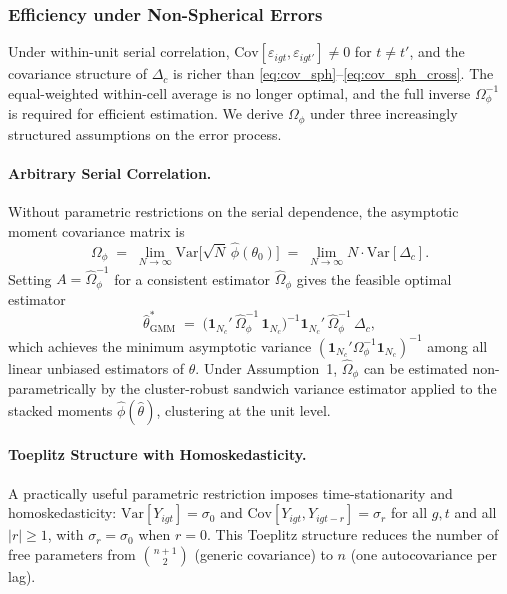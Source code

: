 \documentclass[12pt,letterpaper]{article}
\theoremstyle{remark}
\theoremstyle{definition}
\begin{document}
\subsubsection{Efficiency under Non-Spherical Errors}
\label{sec:gmm_nonspherical}

Under within-unit serial correlation, $\mathrm{Cov}[\varepsilon_{igt},
\varepsilon_{igt'}]\neq0$ for $t\neq t'$, and the covariance structure of
$\Delta_c$ is richer than \eqref{eq:cov_sph}--\eqref{eq:cov_sph_cross}.
The equal-weighted within-cell average is no longer optimal, and the full
inverse $\Omega_\phi^{-1}$ is required for efficient estimation. We derive
$\Omega_\phi$ under three increasingly structured assumptions on the error
process.

\paragraph{Arbitrary Serial Correlation.}
\label{sec:gmm_arbitrary}

Without parametric restrictions on the serial dependence, the asymptotic
moment covariance matrix is
\begin{equation}
  \Omega_\phi
  \;=\;
  \lim_{N\to\infty}
  \mathrm{Var}\!\bigl[\sqrt{N}\,\hat{\phi}(\theta_0)\bigr]
  \;=\;
  \lim_{N\to\infty} N\cdot\mathrm{Var}[\Delta_c].
  \label{eq:omega}
\end{equation}
Setting $A=\hat{\Omega}_\phi^{-1}$ for a consistent estimator
$\hat{\Omega}_\phi$ gives the feasible optimal estimator
\begin{equation}
  \hat{\theta}_{\mathrm{GMM}}^{*}
  \;=\;
  \bigl(\mathbf{1}_{N_c}'\,\hat{\Omega}_\phi^{-1}\,\mathbf{1}_{N_c}\bigr)^{-1}
  \mathbf{1}_{N_c}'\,\hat{\Omega}_\phi^{-1}\,\Delta_c,
  \label{eq:opt_gmm}
\end{equation}
which achieves the minimum asymptotic variance
$(\mathbf{1}_{N_c}'\Omega_\phi^{-1}\mathbf{1}_{N_c})^{-1}$
among all linear unbiased estimators of $\theta$. Under
Assumption~1, $\hat{\Omega}_\phi$ can be estimated non-parametrically
by the cluster-robust sandwich variance estimator applied to the stacked
moments $\hat{\phi}(\hat{\theta})$, clustering at the unit level.

\paragraph{Toeplitz Structure with Homoskedasticity.}
\label{sec:gmm_toeplitz_homo}

A practically useful parametric restriction imposes time-stationarity and
homoskedasticity: $\mathrm{Var}[Y_{igt}]=\sigma_0$ and
$\mathrm{Cov}[Y_{igt},Y_{igt-r}]=\sigma_r$ for all $g,t$ and all $|r|\geq1$,
with $\sigma_r=\sigma_0$ when $r=0$. This Toeplitz structure reduces the
number of free parameters from $\binom{n+1}{2}$ (generic covariance)
to $n$ (one autocovariance per lag).
\end{document}
